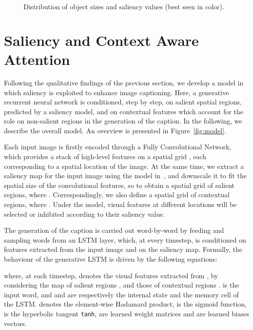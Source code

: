 \begin{figure}[t!]
\centering
{}
\caption{Distribution of object sizes and saliency values (best seen in color).}
\label{fig:areas}
\end{figure}


\section{Saliency and Context Aware Attention}
Following the qualitative findings of the previous section, we develop a model in which saliency is exploited to enhance image captioning. Here, a generative recurrent neural network is conditioned, step by step, on salient spatial regions, predicted by a saliency model, and on contextual features which account for the role on non-salient regions in the generation of the caption. In the following, we describe the overall model. An overview is presented in Figure~\ref{fig:model}.

Each input image  is firstly encoded through a Fully Convolutional Network, which provides a stack of high-level features on a spatial grid , each corresponding to a spatial location of the image. At the same time, we extract a saliency map for the input image using the model in~\cite{cornia2017sam}, and downscale it to fit the spatial size of the convolutional features, so to obtain a spatial grid  of salient regions, where . Correspondingly, we also define a spatial grid of contextual regions,  where . Under the model, visual features at different locations will be selected or inhibited according to their saliency value.

The generation of the caption is carried out word-by-word by feeding and sampling words from an LSTM layer, which, at every timestep, is conditioned on features extracted from the input image and on the saliency map. Formally, the behaviour of the generative LSTM is driven by the following equations:

where, at each timestep,  denotes the visual features extracted from , by considering the map of salient regions , and those of contextual regions .  is the input word, and  and  are respectively the internal state and the memory cell of the LSTM.  denotes the element-wise Hadamard product,  is the sigmoid function,  is the hyperbolic tangent \texttt{tanh},  are learned weight matrices and  are learned biases vectors.


